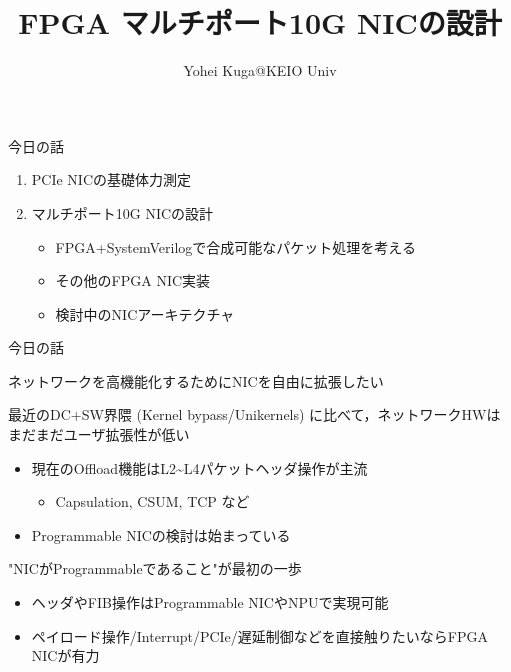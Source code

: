 \documentclass[10pt, compress]{beamer}
\title{FPGA マルチポート10G NICの設計}
\subtitle{}
\date[\today]{}
\author{Yohei Kuga@KEIO Univ}
\institute{高速PCルータ研究会 2015/5}
\begin{document}
\maketitle


\begin{frame}[fragile,t]{今日の話}
\begin{enumerate}
\item PCIe NICの基礎体力測定
\item マルチポート10G NICの設計
	\begin{itemize}
	\item FPGA+SystemVerilogで合成可能なパケット処理を考える
	\item その他のFPGA NIC実装
	\item 検討中のNICアーキテクチャ
	\end{itemize}
\end{enumerate}
\end{frame}


\begin{frame}[fragile,t]{今日の話}

ネットワークを高機能化するためにNICを自由に拡張したい
\vspace{.5em}

最近のDC+SW界隈 (Kernel bypass/Unikernels) に比べて，ネットワークHWはまだまだユーザ拡張性が低い
\vspace{-.5em}
\begin{itemize}
\item 現在のOffload機能はL2\~{}L4パケットヘッダ操作が主流
    \begin{itemize}
        \item Capsulation, CSUM, TCP など
    \end{itemize}
\item Programmable NICの検討は始まっている
\end{itemize}
\vspace{.5em}

"NICがProgrammableであること"が最初の一歩
\vspace{-.5em}
\begin{itemize}
\item ヘッダやFIB操作はProgrammable NICやNPUで実現可能
\item ペイロード操作/Interrupt/PCIe/遅延制御などを直接触りたいならFPGA NICが有力
\end{itemize}

\end{frame}
\end{document}
